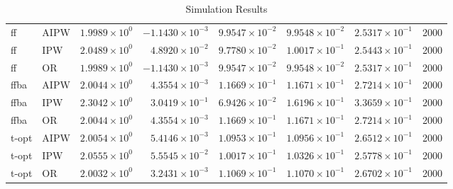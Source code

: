 \begin{table}[ht]
\begin{tabular}{llrrrrrr}
   \midrule
ff & AIPW & $1.9989 \times 10^{0}$ & $-1.1430 \times 10^{-3}$ & $9.9547 \times 10^{-2}$ & $9.9548 \times 10^{-2}$ & $2.5317 \times 10^{-1}$ & 2000 \\ 
  ff & IPW & $2.0489 \times 10^{0}$ & $4.8920 \times 10^{-2}$ & $9.7780 \times 10^{-2}$ & $1.0017 \times 10^{-1}$ & $2.5443 \times 10^{-1}$ & 2000 \\ 
  ff & OR & $1.9989 \times 10^{0}$ & $-1.1430 \times 10^{-3}$ & $9.9547 \times 10^{-2}$ & $9.9548 \times 10^{-2}$ & $2.5317 \times 10^{-1}$ & 2000 \\ 
   \midrule
ffba & AIPW & $2.0044 \times 10^{0}$ & $4.3554 \times 10^{-3}$ & $1.1669 \times 10^{-1}$ & $1.1671 \times 10^{-1}$ & $2.7214 \times 10^{-1}$ & 2000 \\ 
  ffba & IPW & $2.3042 \times 10^{0}$ & $3.0419 \times 10^{-1}$ & $6.9426 \times 10^{-2}$ & $1.6196 \times 10^{-1}$ & $3.3659 \times 10^{-1}$ & 2000 \\ 
  ffba & OR & $2.0044 \times 10^{0}$ & $4.3554 \times 10^{-3}$ & $1.1669 \times 10^{-1}$ & $1.1671 \times 10^{-1}$ & $2.7214 \times 10^{-1}$ & 2000 \\ 
   \midrule
t-opt & AIPW & $2.0054 \times 10^{0}$ & $5.4146 \times 10^{-3}$ & $1.0953 \times 10^{-1}$ & $1.0956 \times 10^{-1}$ & $2.6512 \times 10^{-1}$ & 2000 \\ 
  t-opt & IPW & $2.0555 \times 10^{0}$ & $5.5545 \times 10^{-2}$ & $1.0017 \times 10^{-1}$ & $1.0326 \times 10^{-1}$ & $2.5778 \times 10^{-1}$ & 2000 \\ 
  t-opt & OR & $2.0032 \times 10^{0}$ & $3.2431 \times 10^{-3}$ & $1.1069 \times 10^{-1}$ & $1.1070 \times 10^{-1}$ & $2.6702 \times 10^{-1}$ & 2000 \\ 
   \bottomrule
\end{tabular}
\caption{Simulation Results} 
\label{tab:results}
\end{table}

